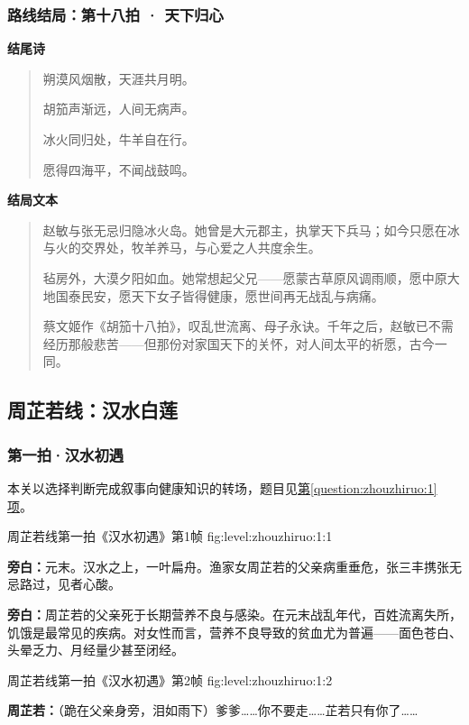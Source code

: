 \subsubsection{路线结局：第十八拍 · 天下归心}
\textbf{结尾诗}\begin{quote}朔漠风烟散，天涯共月明。\par 胡笳声渐远，人间无病声。\par 冰火同归处，牛羊自在行。\par 愿得四海平，不闻战鼓鸣。\end{quote}
\textbf{结局文本}\begin{quote}赵敏与张无忌归隐冰火岛。她曾是大元郡主，执掌天下兵马；如今只愿在冰与火的交界处，牧羊养马，与心爱之人共度余生。\par \par 毡房外，大漠夕阳如血。她常想起父兄——愿蒙古草原风调雨顺，愿中原大地国泰民安，愿天下女子皆得健康，愿世间再无战乱与病痛。\par \par 蔡文姬作《胡笳十八拍》，叹乱世流离、母子永诀。千年之后，赵敏已不需经历那般悲苦——但那份对家国天下的关怀，对人间太平的祈愿，古今一同。\end{quote}

\clearpage
\subsection{周芷若线：汉水白莲}

\subsubsection{第一拍·汉水初遇}\label{plot:zhouzhiruo:1}
本关以选择判断完成叙事向健康知识的转场，题目见\hyperref[question:zhouzhiruo:1]{第\ref*{question:zhouzhiruo:1}项}。

  {周芷若线第一拍《汉水初遇》第1帧}
  {fig:level:zhouzhiruo:1:1}
  {\scriptsize}
  {\textbf{旁白：}元末。汉水之上，一叶扁舟。渔家女周芷若的父亲病重垂危，张三丰携张无忌路过，见者心酸。\par
\textbf{旁白：}周芷若的父亲死于长期营养不良与感染。在元末战乱年代，百姓流离失所，饥饿是最常见的疾病。对女性而言，营养不良导致的贫血尤为普遍——面色苍白、头晕乏力、月经量少甚至闭经。\par}

  {周芷若线第一拍《汉水初遇》第2帧}
  {fig:level:zhouzhiruo:1:2}
  {\scriptsize}
  {\textbf{周芷若：}（跪在父亲身旁，泪如雨下）爹爹……你不要走……芷若只有你了……\par}

